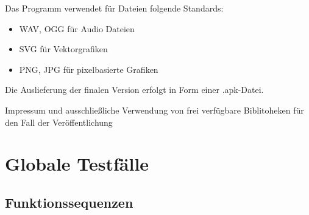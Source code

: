 \documentclass{scrartcl}
\begin{document}
\begin{nflist}[resume]
	\item Das Programm verwendet für Dateien folgende Standards: 
	\begin{itemize}
		\item WAV, OGG für Audio Dateien 
		\item SVG für Vektorgrafiken 
		\item PNG, JPG für pixelbasierte Grafiken 
	\end{itemize}
	\item Die Auslieferung der finalen Version erfolgt in Form einer .apk-Datei.
	\item Impressum und ausschließliche Verwendung von frei verfügbare Biblitoheken
	für den Fall der Veröffentlichung
\end{nflist}

\clearpage








\section{Globale Testfälle}

\subsection{Funktionssequenzen}
\end{document}

